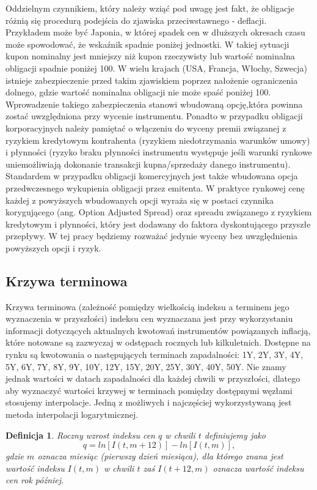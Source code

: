 \documentclass{mini}
\theoremstyle{mythstyle}
\newtheorem{Definicja}{Definicja}[chapter]
\begin{document}
	Oddzielnym czynnikiem, który należy wziąć pod uwagę jest fakt, że obligacje różnią się procedurą podejścia do zjawiska przeciwstawnego - deflacji. Przykładem może być Japonia, w której spadek cen w dłuższych okresach czasu może spowodować, że wskaźnik spadnie poniżej jednostki. W takiej sytuacji kupon nominalny jest mniejszy niż kupon rzeczywisty lub wartość nominalna obligacji spadnie poniżej 100. W wielu krajach (USA, Francja, Włochy, Szwecja) istnieje zabezpieczenie przed takim zjawiskiem poprzez nałożenie ograniczenia dolnego, gdzie wartość nominalna obligacji nie może spaść poniżej 100. Wprowadzenie takiego zabezpieczenia stanowi wbudowaną opcję,która powinna zostać uwzględniona przy wycenie instrumentu. Ponadto w przypadku obligacji korporacyjnych należy pamiętać o włączeniu do wyceny premii związanej z ryzykiem kredytowym kontrahenta (ryzykiem niedotrzymania warunków umowy) i płynności (ryzyko braku płynności instrumentu występuje jeśli warunki rynkowe uniemożliwiają dokonanie transakcji kupna/sprzedaży danego instrumentu). Standardem w przypadku obligacji komercyjnych jest także wbudowana opcja przedwczesnego wykupienia obligacji przez emitenta. W praktyce rynkowej cenę każdej z powyższych wbudowanych opcji wyraża się w postaci czynnika korygującego (ang. Option Adjusted Spread) oraz  spreadu związanego z ryzykiem kredytowym i płynności, który jest dodawany do faktora dyskontującego przyszłe przepływy. W tej pracy będziemy rozważać jedynie wyceny bez uwzględnienia powyższych opcji i ryzyk.
			
	\subsection{Krzywa terminowa}
	
	Krzywa terminowa (zależność pomiędzy wielkością indeksu a terminem jego wyznaczenia w przyszłości) indeksu cen wyznaczana jest przy wykorzystaniu informacji dotyczących aktualnych kwotowań instrumentów powiązanych inflacją, które notowane  są zazwyczaj w odstępach rocznych lub kilkuletnich. Dostępne na rynku są kwotowania o następujących terminach zapadalności: 1Y, 2Y, 3Y, 4Y, 5Y, 6Y, 7Y, 8Y, 9Y, 10Y, 12Y, 15Y, 20Y, 25Y, 30Y, 40Y, 50Y. Nie znamy jednak wartości w datach zapadalności dla każdej chwili w przyszłości, dlatego aby wyznaczyć wartości krzywej w terminach pomiędzy dostępnymi węzłami stosujemy interpolacje. Jedną z możliwych i najczęściej wykorzystywaną jest metoda interpolacji logarytmicznej. \\
	
	\begin{Definicja}
		Roczny wzrost indeksu cen $q$ w chwili $t$ definiujemy jako
		\begin{equation}
		q = ln [I(t,m + 12)] - ln[I(t,m)],
		\end{equation} 
		gdzie $m$ oznacza miesiąc (pierwszy dzień miesiąca), dla którego znana jest wartość indeksu $I(t,m)$ w chwili $t$ zaś $I(t+12,m)$ oznacza wartość indeksu cen rok później.\\
	\end{Definicja}
	
\end{document}
